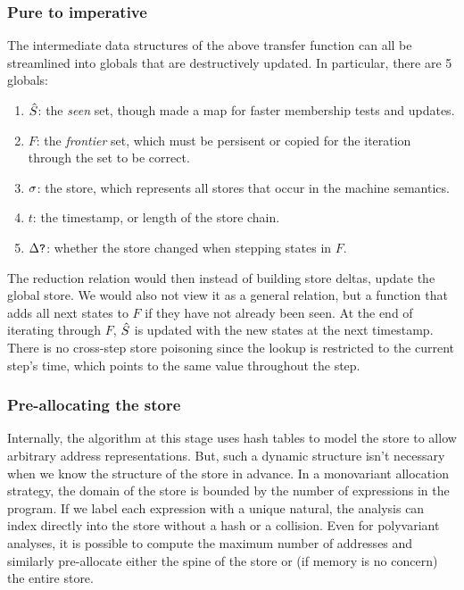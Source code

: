 \documentclass[9pt]{sigplanconf} %
\begin{document}
\subsubsection{Pure to imperative}

The intermediate data structures of the above transfer function can all be streamlined into globals that are destructively updated.
%
In particular, there are 5 globals:

\begin{enumerate}
\item{$\hat{S}$: the \emph{seen} set, though made a map for faster membership tests and updates.}
\item{$F$: the \emph{frontier} set, which must be persisent or copied for the iteration through the set to be correct.}
\item{$\sigma$: the store, which represents all stores that occur in the machine semantics.}
\item{$t$: the timestamp, or length of the store chain.}
\item{$\Delta\mbox{{\tt ?}}$: whether the store changed when stepping states in $F$.}
\end{enumerate}

The reduction relation would then instead of building store deltas, update the global store.
%
We would also not view it as a general relation, but a function that adds all next states to $F$ if they have
not already been seen.
%
At the end of iterating through $F$, $\hat{S}$ is updated with the new states at the next timestamp.
%
There is no cross-step store poisoning since the lookup is restricted to the current step's time, which points to the same value throughout the step.

\subsubsection{Pre-allocating the store}

Internally, the algorithm at this stage uses hash tables to model the store to allow arbitrary address representations.
%
But, such a dynamic structure isn't necessary when we know the structure of the store in advance.%
%
In a monovariant allocation strategy, the domain of the store is bounded by the number of expressions in the program.
%
If we label each expression with a unique natural, the analysis can index directly into the store without a hash or a collision.
%
Even for polyvariant analyses, it is possible to compute the maximum number of addresses and similarly pre-allocate either the spine of the store or (if memory is no concern) the entire store.
\end{document}
